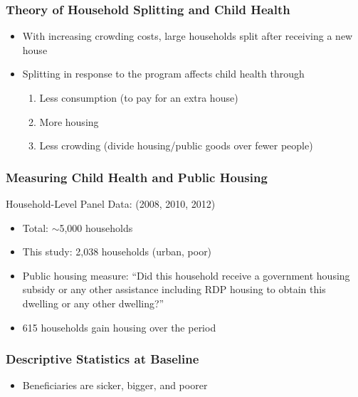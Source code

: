 \documentclass[aspectratio=149]{beamer}
\begin{document}
\begin{frame}
\frametitle{Theory of Household Splitting and Child Health}
\begin{itemize}
  \item With increasing crowding costs, large households split after receiving a new house
  \vspace{.1cm}
  \item Splitting in response to the program affects child health through
    \begin{enumerate}
      \item Less consumption (to pay for an extra house)
      \item More housing
      \item Less crowding (divide housing/public goods over fewer people)
    \end{enumerate}
\end{itemize}
\end{frame}


\begin{frame}
\frametitle{Measuring Child Health and Public Housing}

Household-Level Panel Data: (2008, 2010, 2012)
\begin{itemize}
  \item Total: $\sim$5,000 households
  \item This study: 2,038 households (urban, poor) 
  \item Public housing measure: ``Did this household receive a government housing subsidy or any other assistance including RDP housing to obtain this dwelling or any other dwelling?''
  \item 615 households gain housing over the period
\end{itemize}
\end{frame}


\begin{frame}
\frametitle{Descriptive Statistics at Baseline}
\begin{itemize}
  \item Beneficiaries are sicker, bigger, and poorer
\end{itemize}
\begin{center}

\end{center}
\end{frame}
\end{document}
